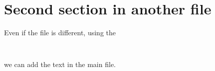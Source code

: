 \section{Second section in another file}
Even if the file is different, using the
\begin{verbatim}
  
\end{verbatim}
we can add the text in the main file.

